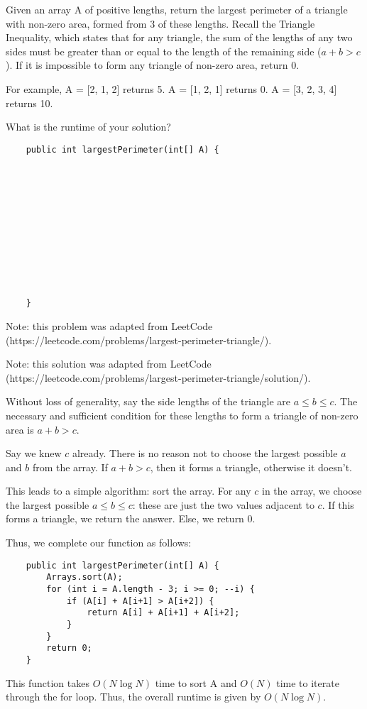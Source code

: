 \question Given an array A of positive lengths, return the largest perimeter of a triangle with non-zero area, formed from 3 of these lengths. Recall the Triangle Inequality, which states that for any triangle, the sum of the lengths of any two sides must be greater than or equal to the length of the remaining side ($a + b > c$). If it is impossible to form any triangle of non-zero area, return 0.

For example, A = [2, 1, 2] returns 5. A = [1, 2, 1] returns 0. A = [3, 2, 3, 4] returns 10.

What is the runtime of your solution?

\begin{verbatim}
    public int largestPerimeter(int[] A) {
        
        
        
        
        
        
        
        
        
        
        
        
    }
\end{verbatim}

Note: this problem was adapted from LeetCode (https://leetcode.com/problems/largest-perimeter-triangle/).

\begin{solution}[1in]
Note: this solution was adapted from LeetCode (https://leetcode.com/problems/largest-perimeter-triangle/solution/).

Without loss of generality, say the side lengths of the triangle are $a \leq b \leq c$. The necessary and sufficient condition for these lengths to form a triangle of non-zero area is $a + b > c$.

Say we knew $c$ already. There is no reason not to choose the largest possible $a$ and $b$ from the array. If $a + b > c$, then it forms a triangle, otherwise it doesn't.

This leads to a simple algorithm: sort the array. For any $c$ in the array, we choose the largest possible $a \leq b \leq c$: these are just the two values adjacent to $c$. If this forms a triangle, we return the answer. Else, we return $0$.

Thus, we complete our function as follows:

\begin{verbatim}
    public int largestPerimeter(int[] A) {
        Arrays.sort(A);
        for (int i = A.length - 3; i >= 0; --i) {
            if (A[i] + A[i+1] > A[i+2]) {
                return A[i] + A[i+1] + A[i+2];
            }
        }
        return 0;
    }
\end{verbatim}

This function takes $O(N \log N)$ time to sort A and $O(N)$ time to iterate through the for loop. Thus, the overall runtime is given by $O(N \log N)$. 

\end{solution}
